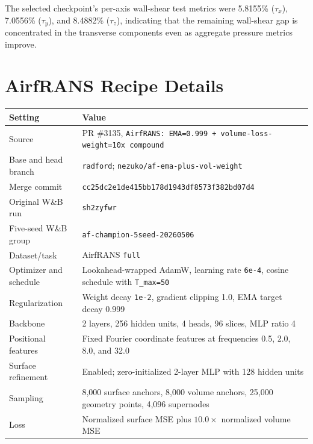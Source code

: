 \documentclass{article}
\begin{document}
The selected checkpoint's per-axis wall-shear test metrics were 5.8155\% ($\tau_x$), 7.0556\% ($\tau_y$), and 8.4882\% ($\tau_z$), indicating that the remaining wall-shear gap is concentrated in the transverse components even as aggregate pressure metrics improve.

\section{AirfRANS Recipe Details}
\label{app:airfrans-recipe}

\begin{center}
  \label{tab:app-airfrans-config}
  \small
  \begin{tabular}{@{}ll@{}}
    \toprule
    Setting & Value \\
    \midrule
    Source & PR \#3135, \texttt{AirfRANS: EMA=0.999 + volume-loss-weight=10x compound} \\
    Base and head branch & \texttt{radford}; \texttt{nezuko/af-ema-plus-vol-weight} \\
    Merge commit & \texttt{cc25dc2e1de415bb178d1943df8573f382bd07d4} \\
    Original W\&B run & \texttt{sh2zyfwr} \\
    Five-seed W\&B group & \texttt{af-champion-5seed-20260506} \\
    Dataset/task & AirfRANS \texttt{full} \\
    Optimizer and schedule & Lookahead-wrapped AdamW, learning rate \texttt{6e-4}, cosine schedule with \texttt{T\_max=50} \\
    Regularization & Weight decay \texttt{1e-2}, gradient clipping 1.0, EMA target decay 0.999 \\
    Backbone & 2 layers, 256 hidden units, 4 heads, 96 slices, MLP ratio 4 \\
    Positional features & Fixed Fourier coordinate features at frequencies 0.5, 2.0, 8.0, and 32.0 \\
    Surface refinement & Enabled; zero-initialized 2-layer MLP with 128 hidden units \\
    Sampling & 8,000 surface anchors, 8,000 volume anchors, 25,000 geometry points, 4,096 supernodes \\
    Loss & Normalized surface MSE plus $10.0 \times$ normalized volume MSE \\
    \bottomrule
  \end{tabular}
\end{center}
\end{document}

